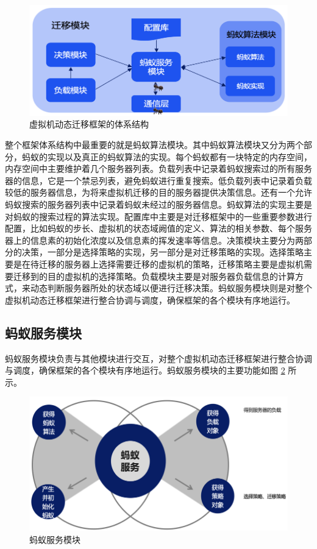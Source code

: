 \begin{figure}[htb]
  \centering
  \includegraphics{./Figure/IMG_Chap3_2.png}
  \caption{虚拟机动态迁移框架的体系结构}\label{Fig:chap3_2}
\end{figure}

整个框架体系结构中最重要的就是蚂蚁算法模块。其中蚂蚁算法模块又分为两个部分，蚂蚁的实现以及真正的蚂蚁算法的实现。每个蚂蚁都有一块特定的内存空间，内存空间中主要维护着几个服务器列表。负载列表中记录着蚂蚁搜索过的所有服务器的信息，它是一个禁忌列表，避免蚂蚁进行重复搜索。低负载列表中记录着负载较低的服务器信息，为将来虚拟机迁移的目的服务器提供决策信息。还有一个允许蚂蚁搜索的服务器列表中记录着蚂蚁未经过的服务器信息。蚂蚁算法的实现主要是对蚂蚁的搜索过程的算法实现。配置库中主要是对迁移框架中的一些重要参数进行配置，比如蚂蚁的步长、虚拟机的状态域阙值的定义、算法的相关参数、每个服务器上的信息素的初始化浓度以及信息素的挥发速率等信息。决策模块主要分为两部分的决策，一部分是选择策略的实现，另一部分是对迁移策略的实现。选择策略主要是在待迁移的服务器上选择需要迁移的虚拟机的策略，迁移策略主要是虚拟机需要迁移到的目的虚拟机的选择策略。负载模块主要是对服务器负载信息的计算方式，来动态判断服务器所处的状态域以便进行迁移决策。蚂蚁服务模块则是对整个虚拟机动态迁移框架进行整合协调与调度，确保框架的各个模块有序地运行。

\subsection{蚂蚁服务模块}
蚂蚁服务模块负责与其他模块进行交互，对整个虚拟机动态迁移框架进行整合协调与调度，确保框架的各个模块有序地运行。蚂蚁服务模块的主要功能如图 \ref{Fig:chap3_3} 所示。

\begin{figure}[htb]
  \centering
  \includegraphics{./Figure/IMG_Chap3_3.png}
  \caption{蚂蚁服务模块}\label{Fig:chap3_3}
\end{figure}

